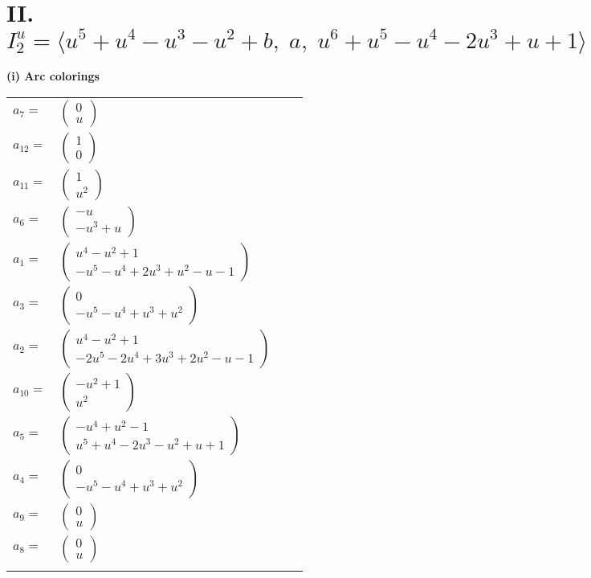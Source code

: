 \documentclass[1p]{elsarticle_modified}
\theoremstyle{definition}
\begin{document}
\centering \section*{II. $I^u_{2}= \langle u^5+u^4- u^3- u^2+b,\;a,\;u^6+u^5- u^4-2 u^3+u+1 \rangle$}
\flushleft \textbf{(i) Arc colorings}\\
\begin{tabular}{m{7pt} m{180pt} m{7pt} m{180pt} }
\flushright $a_{7}=$&$\begin{pmatrix}0\\u\end{pmatrix}$ \\
\flushright $a_{12}=$&$\begin{pmatrix}1\\0\end{pmatrix}$ \\
\flushright $a_{11}=$&$\begin{pmatrix}1\\u^2\end{pmatrix}$ \\
\flushright $a_{6}=$&$\begin{pmatrix}- u\\- u^3+u\end{pmatrix}$ \\
\flushright $a_{1}=$&$\begin{pmatrix}u^4- u^2+1\\- u^5- u^4+2 u^3+u^2- u-1\end{pmatrix}$ \\
\flushright $a_{3}=$&$\begin{pmatrix}0\\- u^5- u^4+u^3+u^2\end{pmatrix}$ \\
\flushright $a_{2}=$&$\begin{pmatrix}u^4- u^2+1\\-2 u^5-2 u^4+3 u^3+2 u^2- u-1\end{pmatrix}$ \\
\flushright $a_{10}=$&$\begin{pmatrix}- u^2+1\\u^2\end{pmatrix}$ \\
\flushright $a_{5}=$&$\begin{pmatrix}- u^4+u^2-1\\u^5+u^4-2 u^3- u^2+u+1\end{pmatrix}$ \\
\flushright $a_{4}=$&$\begin{pmatrix}0\\- u^5- u^4+u^3+u^2\end{pmatrix}$ \\
\flushright $a_{9}=$&$\begin{pmatrix}0\\u\end{pmatrix}$ \\
\flushright $a_{8}=$&$\begin{pmatrix}0\\u\end{pmatrix}$\\&\end{tabular}
\end{document}
